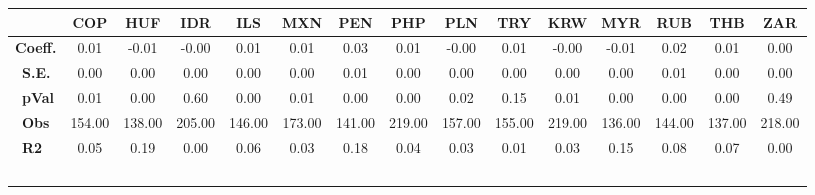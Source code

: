 \begin{tabular}{l|cccccccccccccc}
\hline
&\textbf{COP}&\textbf{HUF}&\textbf{IDR}&\textbf{ILS}&\textbf{MXN}&\textbf{PEN}&\textbf{PHP}&\textbf{PLN}&\textbf{TRY}&\textbf{KRW}&\textbf{MYR}&\textbf{RUB}&\textbf{THB}&\textbf{ZAR}\\\hline
\textbf{Coeff.}&0.01&-0.01&-0.00&0.01&0.01&0.03&0.01&-0.00&0.01&-0.00&-0.01&0.02&0.01&0.00\\\
\textbf{S.E.}&0.00&0.00&0.00&0.00&0.00&0.01&0.00&0.00&0.00&0.00&0.00&0.01&0.00&0.00\\\
\textbf{pVal}&0.01&0.00&0.60&0.00&0.01&0.00&0.00&0.02&0.15&0.01&0.00&0.00&0.00&0.49\\\
\textbf{Obs}&154.00&138.00&205.00&146.00&173.00&141.00&219.00&157.00&155.00&219.00&136.00&144.00&137.00&218.00\\\
\textbf{R2}&0.05&0.19&0.00&0.06&0.03&0.18&0.04&0.03&0.01&0.03&0.15&0.08&0.07&0.00\\\
\end{tabular}
